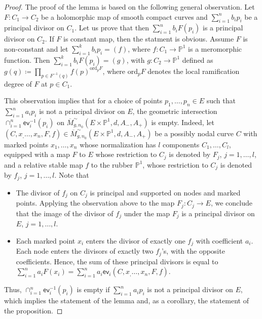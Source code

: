 \documentclass[10pt,a4paper]{amsart}
\begin{document}
\begin{proof}
The proof of the lemma is based on the following general observation. Let $F\colon C_1\to C_2$ be a holomorphic map of smooth compact curves and $\sum_{i=1}^n b_i p_i$ be a principal divisor on $C_1$. Let us prove that then $\sum_{i=1}^n b_i F(p_i)$ is a principal divisor on $C_2$. If $F$ is constant map, then the statment is obvious. Assume $F$ is non-constant and let $\sum_{i=1}^k b_i p_i = (f)$, where $f\colon C_1\to \mathbb{P}^1$ is a meromorphic function. Then $\sum_{i=1}^k b_i F(p_i) = (g)$, with $g\colon C_2\to \mathbb{P}^1$ defined as $g(q) \coloneqq \prod_{p\in F^{-1}(q)} f(p)^{\mathrm{ord}_p F}$, where $\mathrm{ord}_p F$ denotes the local ramification degree of $F$ at $p\in C_1$. 
	
This observation implies that for a choice of points $p_1,\dots,p_n\in E$ such that $\sum_{i=1}^n a_i p_i$ is not a principal divisor on $E$, the geometric intersection $\cap_{i=1}^n \mathsf{ev}_i^{-1}(p_i)$ on $\overline{M}^\sim_{g,n_0}(E
\times \mathbb{P}^1, d, A_-, A_+)$ is empty. Indeed, let $(C,x_,\dots,x_n,F,f)\in \overline{M}^\sim_{g,n_0}(E
\times \mathbb{P}^1, d, A_-, A_+)$ be a possibly nodal curve $C$ with marked points $x_1,\dots,x_n$ whose normalization has $l$ components $C_1,\dots,C_l$, equipped with a map $F$ to $E$ whose restriction to $C_j$ is denoted by $F_j$, $j=1,\dots,l$, and a relative stable map $f$ to the rubber $\mathbb{P}^1$, whose restriction to $C_j$ is denoted by $f_j$, $j=1,\dots,l$. Note that
\begin{itemize}
	\item The divisor of $f_j$ on $C_j$ is principal and supported on nodes and marked points. Applying the observation above to the map $F_j\colon C_j\to E$, we conclude that the image of the divisor of $f_j$ under the map $F_j$ is a principal divisor on $E$, $j=1,\dots,l$. 
	\item Each marked point $x_i$ enters the divisor of exactly one $f_j$ with coefficient $a_i$. Each node enters the divisors of exactly two $f_j$'s, with the opposite coefficients. Hence, the sum of these principal divisors is equal to $\sum_{i=1}^n a_i F(x_i) = \sum_{i=1}^n a_i \mathsf{ev}_i(C,x_,\dots,x_n,F,f)$.
\end{itemize}
Thus,  $\cap_{i=1}^n \mathsf{ev}_i^{-1}(p_i)$ is empty if  $\sum_{i=1}^n a_i p_i$ is not a principal divisor on $E$, which implies the statement of the lemma and, as a corollary, the statement of the proposition.
\end{proof}
\end{document}
